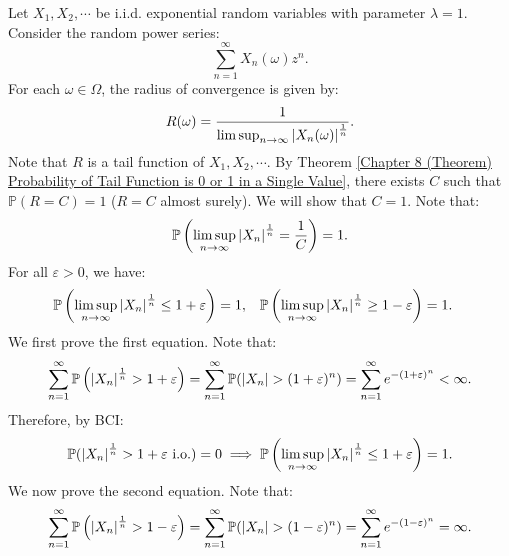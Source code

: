 \documentclass{huhtakm-template-book-v2}
\newcommand{\prob}{\mathbb{P}}
\begin{document}
    \begin{eg}
        Let $X_{1},X_{2},\cdots$ be i.i.d. exponential random variables with parameter $\lambda = 1$. 
        Consider the random power series:
        \begin{equation*}
            \sum_{n = 1}^{\infty}X_{n}(\omega)z^{n}.
        \end{equation*}
        For each $\omega \in \Omega$, the radius of convergence is given by:
        \begin{equation*}
            R(\omega) = \frac{1}{\limsup_{n \to \infty}\left|{X_{n}(\omega)}\right|^{\frac{1}{n}}}.
        \end{equation*}
        Note that $R$ is a tail function of $X_{1},X_{2},\cdots$. By Theorem \ref{Chapter 8 (Theorem) Probability of Tail Function is 0 or 1 in a Single Value}, there exists $C$ such that $\prob(R = C) = 1$ ($R = C$ almost surely). We will show that $C = 1$. Note that:
        \begin{equation*}
            \prob\left(\limsup_{n \to \infty}\abs{X_{n}}^{\frac{1}{n}} = \frac{1}{C}\right) = 1.
        \end{equation*}
        For all $\varepsilon > 0$, we have:
        \begin{align*}
            \prob\left(\limsup_{n \to \infty}\abs{X_{n}}^{\frac{1}{n}} \leq 1+\varepsilon\right) &= 1, & \prob\left(\limsup_{n \to \infty}\abs{X_{n}}^{\frac{1}{n}} \geq  1-\varepsilon\right) &= 1.
        \end{align*}
        We first prove the first equation. Note that:
        \begin{equation*}
            \sum_{n = 1}^{\infty}\prob\left(\abs{X_{n}}^{\frac{1}{n}} > 1+\varepsilon\right) = \sum_{n = 1}^{\infty}\prob(\abs{X_{n}} > (1+\varepsilon)^{n}) = \sum_{n = 1}^{\infty}e^{-(1+\varepsilon)^{n}} < \infty.
        \end{equation*}
        Therefore, by BCI:
        \begin{equation*}
            \prob(\abs{X_{n}}^{\frac{1}{n}} > 1+\varepsilon\text{ i.o.}) = 0 \implies \prob\left(\limsup_{n \to \infty}\abs{X_{n}}^{\frac{1}{n}} \leq 1+\varepsilon\right) = 1.
        \end{equation*}
        We now prove the second equation. Note that:
        \begin{equation*}
            \sum_{n = 1}^{\infty}\prob\left(\abs{X_{n}}^{\frac{1}{n}} > 1-\varepsilon\right) = \sum_{n = 1}^{\infty}\prob(\abs{X_{n}} > (1-\varepsilon)^{n}) = \sum_{n = 1}^{\infty}e^{-(1-\varepsilon)^{n}} = \infty.

\end{equation*}
\end{eg}
\end{document}
